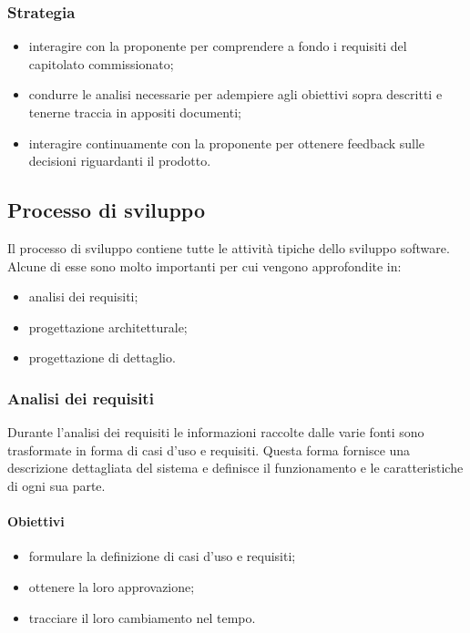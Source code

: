 	\subsubsection{Strategia}
	\begin{itemize}
		\item interagire con la proponente per comprendere a fondo i requisiti del capitolato commissionato;
		\item condurre le analisi necessarie per adempiere agli obiettivi sopra descritti e tenerne traccia in appositi documenti;
		\item interagire continuamente con la proponente per ottenere feedback sulle decisioni riguardanti il prodotto.
	\end{itemize}
	\subsection{Processo di sviluppo}
	Il processo di sviluppo contiene tutte le attività tipiche dello sviluppo software. Alcune di esse sono molto importanti per cui vengono approfondite in: 
	\begin{itemize}
		\item analisi dei requisiti;
		\item progettazione architetturale;
		\item progettazione di dettaglio.
	\end{itemize}
	\subsubsection{Analisi dei requisiti}
	Durante l'analisi dei requisiti le informazioni raccolte dalle varie fonti sono trasformate in forma di casi d'uso e requisiti.
	Questa forma fornisce una descrizione dettagliata del sistema e definisce il funzionamento e le caratteristiche di ogni sua parte.
		\paragraph{Obiettivi}
		\begin{itemize}
			\item formulare la definizione di casi d'uso e requisiti;
			\item ottenere la loro approvazione;
			\item tracciare il loro cambiamento nel tempo.
		\end{itemize}		
